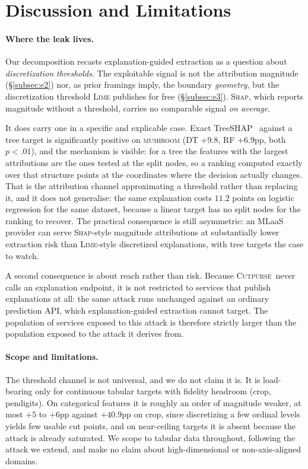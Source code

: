 \documentclass[sigconf,anonymous,review]{acmart}
\newcommand{\sys}{\textsc{Cutpurse}}
\begin{document}
\section{Discussion and Limitations}
\label{sec:discussion}
\paragraph{Where the leak lives.} Our decomposition recasts explanation-guided extraction as a
question about \emph{discretization thresholds}. The exploitable signal is not the attribution magnitude
(\S\ref{subsec:e2}) nor, as prior framings imply, the boundary \emph{geometry}, but the discretization
threshold \textsc{Lime} publishes for free (\S\ref{subsec:e3}). \textsc{Shap}, which reports magnitude
without a threshold, carries no comparable signal \emph{on average}.

It does carry one in a specific and explicable case. Exact
TreeSHAP~\cite{lundberg2020treeshap} against a tree target is
significantly positive on \textsc{mushroom} (DT $+9.8$, RF $+6.9$pp, both $p{<}.01$), and the
mechanism is visible: for a tree the features with the largest attributions are
the ones tested at the split nodes, so a ranking computed exactly over that structure points at the
coordinates where the decision actually changes. That is the attribution channel approximating a
threshold rather than replacing it, and it does not generalise: the same explanation costs
$11.2$ points on logistic regression for the same dataset, because a linear target has no split nodes
for the ranking to recover. The practical consequence is still asymmetric: an MLaaS provider can serve
\textsc{Shap}-style magnitude attributions at substantially lower extraction risk than
\textsc{Lime}-style discretized explanations, with tree targets the case to watch.

A second consequence is about reach rather than risk. Because \sys\ never calls an explanation
endpoint, it is not restricted to services that publish explanations at all: the same attack runs
unchanged against an ordinary prediction API, which explanation-guided extraction cannot target. The
population of services exposed to this attack is therefore strictly larger than the population exposed
to the attack it derives from.

\paragraph{Scope and limitations.} The threshold channel is not universal, and we do not claim it is.
It is load-bearing only for continuous tabular targets with fidelity headroom (crop, pendigits). On
categorical features it is roughly an order of magnitude weaker, at most $+5$ to $+6$pp against
$+40.9$pp on crop, since discretizing a few ordinal levels yields few usable cut points, and on
near-ceiling targets it is absent because the attack is already saturated. We scope to tabular data throughout, following the attack we extend, and make no
claim about high-dimensional or non-axis-aligned domains.
\end{document}
